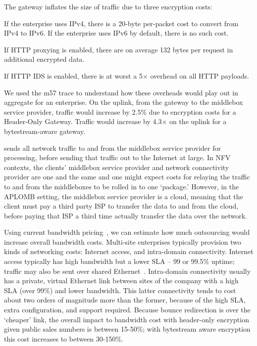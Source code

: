 The gateway inflates the size of traffic due to three encryption costs:
\begin{CompactItemize}
  \item If the enterprise uses IPv4, there is a 20-byte per-packet cost to convert from IPv4 to IPv6. If the enterprise uses IPv6 by default, there is no such cost.
  \item If HTTP proxying is enabled, there are on average 132 bytes per request in additional encrypted data.
  \item If HTTP IDS is enabled, there is at worst a 5$\times$ overhead on all HTTP payloads.
\end{CompactItemize}
We used the m57 trace to understand how these overheads would play out in aggregate for an enterprise.
On the uplink, from the gateway to the middlebox service provider, traffic would increase by 2.5\% due to encryption costs for a Header-Only Gateway. Traffic would increase by 4.3$\times$ on the uplink for a bytestream-aware gateway. 


\sys sends all network traffic to and from the middlebox service provider for processing, before sending that traffic out to the Internet at large. In NFV contexts, the clients' middlebox service provider and network connectivity provider are one and the same and one might expect costs for relaying the traffic to and from the middleboxes to be rolled in to one `package.' 
However, in the APLOMB setting, the middlebox service provider is a cloud, meaning that the client must pay a third party ISP to transfer the data to and from the cloud, before paying that ISP a third time actually transfer the data over the network.

Using current bandwidth pricing~\cite{comcast-costs, megapath-costs, verizon-costs}, we can estimate how much outsourcing would increase overall bandwidth costs.
Multi-site enterprises typically provision two kinds of networking costs: Internet access, and intra-domain connectivity. 
Internet access typically has high bandwidth but a lower SLA -- 99 or 99.5\% uptime; traffic may also be sent over shared Ethernet~\cite{comcast-costs, verizon-costs}.
Intra-domain connectivity usually has a private, virtual Ethernet link between sites of the company with a high SLA (over 99\%) and lower bandwidth.
This latter connectivity tends to cost about two orders of magnitude more than the former, because of the high SLA, extra configuration, and support required.
Because bounce redirection is over the `cheaper' link, the overall impact to bandwidth cost with header-only encryption given public sales numbers is between 15-50\%; with bytestream aware encryption this cost increases to between 30-150\%. 

